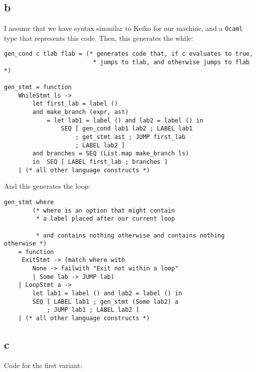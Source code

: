 \subsection{b}

I assume that we have syntax simmilar to Keiko for our machine, and a \texttt{Ocaml} type that represents this code. Then, this generates the while:\\

\begin{lstlisting}[language=Ml]
gen_cond c tlab flab = (* generates code that, if c evaluates to true,
                         * jumps to tlab, and otherwise jumps to flab *)

gen_stmt = function
    WhileStmt ls -> 
        let first_lab = label ()
        and make_branch (expr, ast)
            = let lab1 = label () and lab2 = label () in
                SEQ [ gen_cond lab1 lab2 ; LABEL lab1
                    ; get_stmt ast ; JUMP first_lab
                    ; LABEL lab2 ]
        and branches = SEQ (List.map make_branch ls)
        in  SEQ [ LABEL first_lab ; branches ]
    | (* all other language constructs *)
\end{lstlisting}

And this generates the loop:\\
\begin{lstlisting}[language=Ml]
gen_stmt where
        (* where is an option that might contain
         * a label placed after our current loop
         
         * and contains nothing otherwise and contains nothing otherwise *)
    = function
     ExitStmt -> (match where with
        None -> failwith "Exit not within a loop"
        | Some lab -> JUMP lab)
    | LoopStmt a ->
        let lab1 = label () and lab2 = label () in
        SEQ [ LABEL lab1 ; gen_stmt (Some lab2) a
            ; JUMP lab1 ; LABEL lab2 ]
    | (* all other language constructs *)
\end{lstlisting}

\subsection{c}

Code for the first variant:

